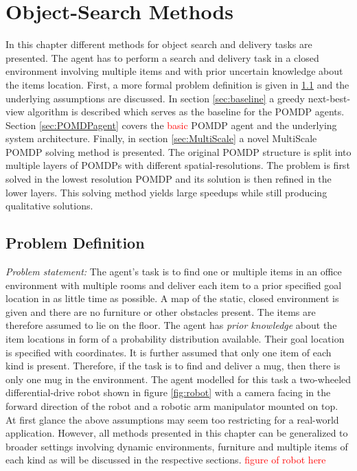 \chapter{Object-Search Methods}
\label{sec:object_search}
In this chapter different methods for object search and delivery tasks are presented. The agent has to perform a search and delivery task in a closed environment involving multiple items and with prior uncertain knowledge about the items location. First, a more formal problem definition is given in \ref{sec:problemdef} and the underlying assumptions are discussed. In section \ref{sec:baseline} a greedy next-best-view algorithm is described which serves as the baseline for the POMDP agents. Section \ref{sec:POMDPagent} covers the \textcolor{red}{basic} POMDP agent and the underlying system architecture. Finally, in section \ref{sec:MultiScale} a novel MultiScale POMDP solving method is presented. The original POMDP structure is split into multiple layers of POMDPs with different spatial-resolutions. The problem is first solved in the lowest resolution POMDP and its solution is then refined in the lower layers. This solving method yields large speedups while still producing qualitative solutions.  

\section{Problem Definition}\label{sec:problemdef}
\textit{Problem statement:} 
The agent's task is to find one or multiple items in an office environment with multiple rooms and deliver each item to a prior specified goal location in as little time as possible. A map of the static, closed environment is given and there are no furniture or other obstacles present. The items are therefore assumed to lie on the floor. The agent has \textit{prior knowledge} about the item locations in form of a probability distribution available. Their goal location is specified with coordinates. It is further assumed that only one item of each kind is present. Therefore, if the task is to find and deliver a mug, then there is only one mug in the environment. The agent modelled for this task a two-wheeled differential-drive robot shown in figure \ref{fig:robot} with a camera facing in the forward direction of the robot and a robotic arm manipulator mounted on top.\\

At first glance the above assumptions may seem too restricting for a real-world application. However, all methods presented in this chapter can be generalized to broader settings involving dynamic environments, furniture and multiple items of each kind as will be discussed in the respective sections. \textcolor{red}{figure of robot here}
